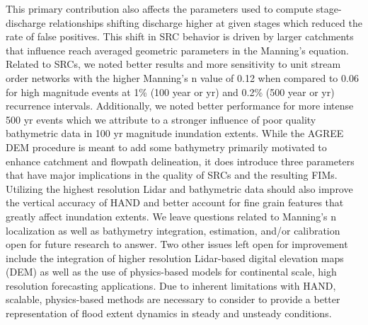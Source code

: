 This primary contribution also affects the parameters used to compute stage-discharge relationships shifting discharge higher at given stages which reduced the rate of false positives.
This shift in SRC behavior is driven by larger catchments that influence reach averaged geometric parameters in the Manning's equation.
Related to SRCs, we noted better results and more sensitivity to unit stream order networks with the higher Manning's n value of 0.12 when compared to 0.06 for high magnitude events at 1\% (100 year or yr) and 0.2\% (500 year or yr) recurrence intervals.
Additionally, we noted better performance for more intense 500 yr events which we attribute to a stronger influence of poor quality bathymetric data in 100 yr magnitude inundation extents.
While the AGREE DEM procedure is meant to add some bathymetry primarily motivated to enhance catchment and flowpath delineation, it does introduce three parameters that have major implications in the quality of SRCs and the resulting FIMs.
Utilizing the highest resolution Lidar and bathymetric data should also improve the vertical accuracy of HAND and better account for fine grain features that greatly affect inundation extents.
We leave questions related to Manning's n localization as well as bathymetry integration, estimation, and/or calibration open for future research to answer.
Two other issues left open for improvement include the integration of higher resolution Lidar-based digital elevation maps (DEM) as well as the use of physics-based models for continental scale, high resolution forecasting applications.
Due to inherent limitations with HAND, scalable, physics-based methods are necessary to consider to provide a better representation of flood extent dynamics in steady and unsteady conditions.
